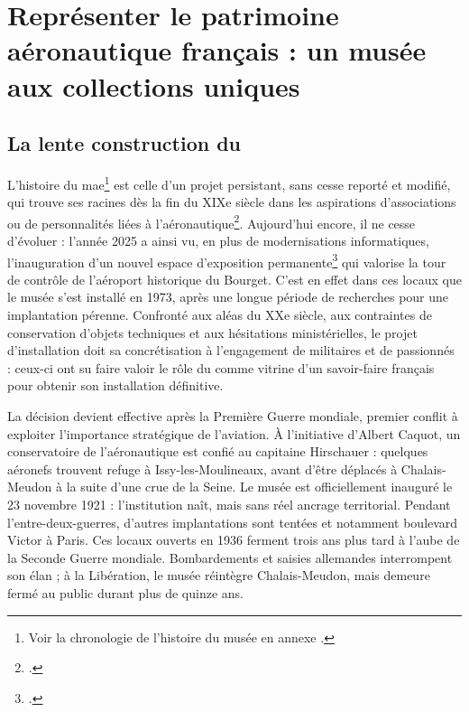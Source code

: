 \section{\label{I-A-1}Représenter le patrimoine aéronautique français : un musée aux collections uniques}

\subsection{La lente construction du \mae}

L'histoire du \acf{mae}\footnote{Voir la chronologie de l'histoire du musée en annexe .} est celle d'un projet persistant, sans cesse reporté et modifié, qui trouve ses racines dès la fin du XIXe siècle dans les aspirations d'associations ou de personnalités liées à l'aéronautique\footcite{terrierAeroportParisBourget2019}. Aujourd'hui encore, il ne cesse d'évoluer : l'année 2025 a ainsi vu, en plus de modernisations informatiques, l'inauguration d'un nouvel espace d'exposition permanente\footcite{museedelairetdelespaceHallNavigationAerienne2025} qui valorise la tour de contrôle de l'aéroport historique du Bourget. C'est en effet dans ces locaux que le musée s'est installé en 1973, après une longue période de recherches pour une implantation pérenne. Confronté aux aléas du XXe siècle, aux contraintes de conservation d'objets techniques et aux hésitations ministérielles, le projet d'installation doit sa concrétisation à l'engagement de militaires et de passionnés : ceux-ci ont su faire valoir le rôle du \mae comme vitrine d'un savoir-faire français pour obtenir son installation définitive.

La décision devient effective après la Première Guerre mondiale, premier conflit à exploiter l'importance stratégique de l'aviation. À l'initiative d'Albert Caquot, un conservatoire de l'aéronautique est confié au capitaine Hirschauer : quelques aéronefs trouvent refuge à Issy-les-Moulineaux, avant d'être déplacés à Chalais-Meudon à la suite d'une crue de la Seine. Le musée est officiellement inauguré le 23 novembre 1921 : l'institution naît, mais sans réel ancrage territorial. Pendant l'entre-deux-guerres, d'autres implantations sont tentées et notamment boulevard Victor à Paris. Ces locaux ouverts en 1936 ferment trois ans plus tard à l'aube de la Seconde Guerre mondiale. Bombardements et saisies allemandes interrompent son élan ; à la Libération, le musée réintègre Chalais-Meudon, mais demeure fermé au public durant plus de quinze ans.

